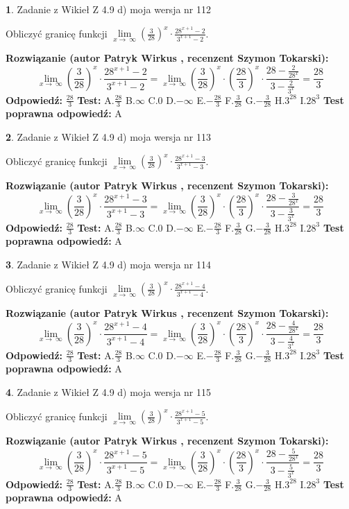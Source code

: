 \documentclass[12pt, a4paper]{article}
\theoremstyle{definition} %
\newtheorem{zad}{}
\newcommand{\zadStart}[1]{\begin{zad}#1\newline}
\newcommand{\zadStop}{\end{zad}}
\newcommand{\rozwStart}[2]{\noindent \textbf{Rozwiązanie (autor #1 , recenzent #2): }\newline}
\newcommand{\rozwStop}{\newline}
\newcommand{\odpStart}{\noindent \textbf{Odpowiedź:}\newline}
\newcommand{\odpStop}{\newline}
\newcommand{\testStart}{\noindent \textbf{Test:}\newline}
\newcommand{\testStop}{\newline}
\newcommand{\kluczStart}{\noindent \textbf{Test poprawna odpowiedź:}\newline}
\newcommand{\kluczStop}{\newline}
\begin{document}
\zadStart{Zadanie z Wikieł Z 4.9 d) moja wersja nr 112}


Obliczyć granicę funkcji  $\lim\limits_{x\to\ \infty}(\frac{3}{28})^{x}\cdot\frac{28^{x+1}-2}{3^{x+1}-2}$.
\zadStop
\rozwStart{Patryk Wirkus}{Szymon Tokarski}
$$\lim\limits_{x\to\ \infty}(\frac{3}{28})^{x}\cdot\frac{28^{x+1}-2}{3^{x+1}-2}=\lim\limits_{x\to\ \infty}(\frac{3}{28})^{x}\cdot(\frac{28}{3})^{x} \cdot \frac{28-\frac{2}{28^{x}}}{3-\frac{2}{3^{x}}} = \frac{28}{3}$$
\rozwStop
\odpStart
$\frac{28}{3}$
\odpStop
\testStart
A.$\frac{28}{3}$ B.$\infty$ C.$0$ D.$-\infty$ E.$-\frac{28}{3}$
F.$\frac{3}{28}$ G.$-\frac{3}{28}$
H.$3^{28}$
I.$28^{3}$
\testStop
\kluczStart
A
\kluczStop



\zadStart{Zadanie z Wikieł Z 4.9 d) moja wersja nr 113}


Obliczyć granicę funkcji  $\lim\limits_{x\to\ \infty}(\frac{3}{28})^{x}\cdot\frac{28^{x+1}-3}{3^{x+1}-3}$.
\zadStop
\rozwStart{Patryk Wirkus}{Szymon Tokarski}
$$\lim\limits_{x\to\ \infty}(\frac{3}{28})^{x}\cdot\frac{28^{x+1}-3}{3^{x+1}-3}=\lim\limits_{x\to\ \infty}(\frac{3}{28})^{x}\cdot(\frac{28}{3})^{x} \cdot \frac{28-\frac{3}{28^{x}}}{3-\frac{3}{3^{x}}} = \frac{28}{3}$$
\rozwStop
\odpStart
$\frac{28}{3}$
\odpStop
\testStart
A.$\frac{28}{3}$ B.$\infty$ C.$0$ D.$-\infty$ E.$-\frac{28}{3}$
F.$\frac{3}{28}$ G.$-\frac{3}{28}$
H.$3^{28}$
I.$28^{3}$
\testStop
\kluczStart
A
\kluczStop



\zadStart{Zadanie z Wikieł Z 4.9 d) moja wersja nr 114}


Obliczyć granicę funkcji  $\lim\limits_{x\to\ \infty}(\frac{3}{28})^{x}\cdot\frac{28^{x+1}-4}{3^{x+1}-4}$.
\zadStop
\rozwStart{Patryk Wirkus}{Szymon Tokarski}
$$\lim\limits_{x\to\ \infty}(\frac{3}{28})^{x}\cdot\frac{28^{x+1}-4}{3^{x+1}-4}=\lim\limits_{x\to\ \infty}(\frac{3}{28})^{x}\cdot(\frac{28}{3})^{x} \cdot \frac{28-\frac{4}{28^{x}}}{3-\frac{4}{3^{x}}} = \frac{28}{3}$$
\rozwStop
\odpStart
$\frac{28}{3}$
\odpStop
\testStart
A.$\frac{28}{3}$ B.$\infty$ C.$0$ D.$-\infty$ E.$-\frac{28}{3}$
F.$\frac{3}{28}$ G.$-\frac{3}{28}$
H.$3^{28}$
I.$28^{3}$
\testStop
\kluczStart
A
\kluczStop



\zadStart{Zadanie z Wikieł Z 4.9 d) moja wersja nr 115}


Obliczyć granicę funkcji  $\lim\limits_{x\to\ \infty}(\frac{3}{28})^{x}\cdot\frac{28^{x+1}-5}{3^{x+1}-5}$.
\zadStop
\rozwStart{Patryk Wirkus}{Szymon Tokarski}
$$\lim\limits_{x\to\ \infty}(\frac{3}{28})^{x}\cdot\frac{28^{x+1}-5}{3^{x+1}-5}=\lim\limits_{x\to\ \infty}(\frac{3}{28})^{x}\cdot(\frac{28}{3})^{x} \cdot \frac{28-\frac{5}{28^{x}}}{3-\frac{5}{3^{x}}} = \frac{28}{3}$$
\rozwStop
\odpStart
$\frac{28}{3}$
\odpStop
\testStart
A.$\frac{28}{3}$ B.$\infty$ C.$0$ D.$-\infty$ E.$-\frac{28}{3}$
F.$\frac{3}{28}$ G.$-\frac{3}{28}$
H.$3^{28}$
I.$28^{3}$
\testStop
\kluczStart
A
\kluczStop
\end{document}

